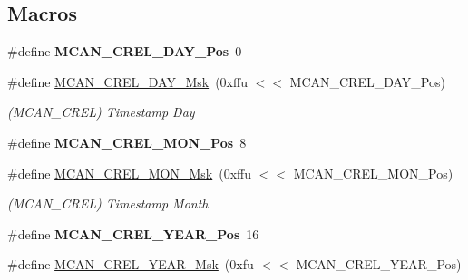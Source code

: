 \subsection*{Macros}
\begin{DoxyCompactItemize}
\item 
\mbox{\label{group__SAMV71__MCAN_gaf61a7d95d23ade51709f2c0ea6a38f62}} 
\#define {\bfseries M\+C\+A\+N\+\_\+\+C\+R\+E\+L\+\_\+\+D\+A\+Y\+\_\+\+Pos}~0
\item 
\mbox{\label{group__SAMV71__MCAN_gaf8438246c21cee36be2ee57d8e020b22}} 
\#define \mbox{\hyperlink{group__SAMV71__MCAN_gaf8438246c21cee36be2ee57d8e020b22}{M\+C\+A\+N\+\_\+\+C\+R\+E\+L\+\_\+\+D\+A\+Y\+\_\+\+Msk}}~(0xffu $<$$<$ M\+C\+A\+N\+\_\+\+C\+R\+E\+L\+\_\+\+D\+A\+Y\+\_\+\+Pos)
\begin{DoxyCompactList}\small\item\em (M\+C\+A\+N\+\_\+\+C\+R\+EL) Timestamp Day \end{DoxyCompactList}\item 
\mbox{\label{group__SAMV71__MCAN_ga810f652b1f88a124d98c997dbba6ba97}} 
\#define {\bfseries M\+C\+A\+N\+\_\+\+C\+R\+E\+L\+\_\+\+M\+O\+N\+\_\+\+Pos}~8
\item 
\mbox{\label{group__SAMV71__MCAN_ga127d61651a048aa68ddcc7317fb0f1f5}} 
\#define \mbox{\hyperlink{group__SAMV71__MCAN_ga127d61651a048aa68ddcc7317fb0f1f5}{M\+C\+A\+N\+\_\+\+C\+R\+E\+L\+\_\+\+M\+O\+N\+\_\+\+Msk}}~(0xffu $<$$<$ M\+C\+A\+N\+\_\+\+C\+R\+E\+L\+\_\+\+M\+O\+N\+\_\+\+Pos)
\begin{DoxyCompactList}\small\item\em (M\+C\+A\+N\+\_\+\+C\+R\+EL) Timestamp Month \end{DoxyCompactList}\item 
\mbox{\label{group__SAMV71__MCAN_gaf6dc227c39566d4bc34038e9c52f00e5}} 
\#define {\bfseries M\+C\+A\+N\+\_\+\+C\+R\+E\+L\+\_\+\+Y\+E\+A\+R\+\_\+\+Pos}~16
\item 
\mbox{\label{group__SAMV71__MCAN_gabf97654fae04d4a41c3b9076285ba15e}} 
\#define \mbox{\hyperlink{group__SAMV71__MCAN_gabf97654fae04d4a41c3b9076285ba15e}{M\+C\+A\+N\+\_\+\+C\+R\+E\+L\+\_\+\+Y\+E\+A\+R\+\_\+\+Msk}}~(0xfu $<$$<$ M\+C\+A\+N\+\_\+\+C\+R\+E\+L\+\_\+\+Y\+E\+A\+R\+\_\+\+Pos)
$$
\end{DoxyCompactItemize}
